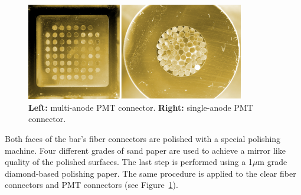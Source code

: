 \documentclass[a4paper,11pt]{article}
\begin{document}
\begin{figure}[htp!]
 \centering
 \includegraphics[width=0.85\textwidth]{./pmt_connectors.JPG}
 \caption[PMT connectors]{{\bf Left:} multi-anode PMT connector. {\bf Right:} single-anode PMT connector.}
 \label{fig:pmt_connectors}
\end{figure}

Both faces of the bar's fiber connectors are polished with a special polishing machine. Four different grades of sand paper are used to achieve
a mirror like quality of the polished surfaces. The last step is performed using a 1$\mu$m grade
diamond-based polishing paper. The same procedure is applied to the clear fiber connectors and PMT connectors (see Figure~\ref{fig:pmt_connectors}).
\end{document}
